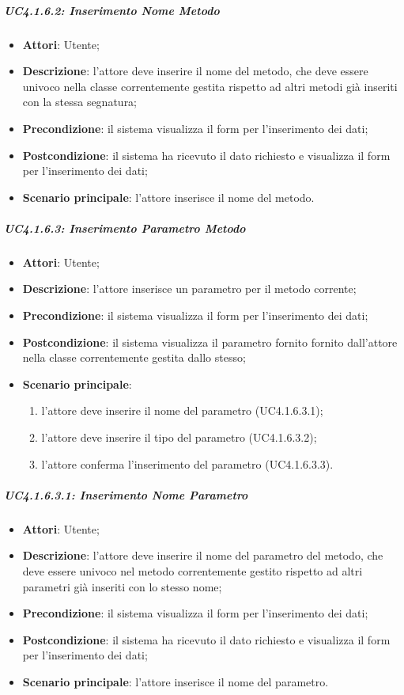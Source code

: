 \subparagraph{UC4.1.6.2: Inserimento Nome Metodo}
\label{UC4.1.6.2}
\begin{itemize}
	\item \textbf{Attori}: Utente;
	\item \textbf{Descrizione}: l'attore deve inserire il nome del metodo, che deve essere univoco nella classe correntemente gestita rispetto ad altri metodi già inseriti con la stessa segnatura;
	\item \textbf{Precondizione}: il sistema visualizza il form per l'inserimento dei dati;
	\item \textbf{Postcondizione}: il sistema ha ricevuto il dato richiesto e visualizza il form per l'inserimento dei dati;
	\item \textbf{Scenario principale}: l'attore inserisce il nome del metodo.
\end{itemize}

\subparagraph{UC4.1.6.3: Inserimento Parametro Metodo}
\label{UC4.1.6.3}
\begin{itemize}
	\item \textbf{Attori}: Utente;
	\item \textbf{Descrizione}: l'attore inserisce un parametro per il metodo corrente;
	\item \textbf{Precondizione}: il sistema visualizza il form per l'inserimento dei dati;
	\item \textbf{Postcondizione}: il sistema visualizza il parametro fornito fornito dall'attore nella classe correntemente gestita dallo stesso;
	\item \textbf{Scenario principale}:
	\begin{enumerate}
		\item l'attore deve inserire il nome del parametro (UC4.1.6.3.1);
		\item l'attore deve inserire il tipo del parametro (UC4.1.6.3.2);
		\item l'attore conferma l'inserimento del parametro (UC4.1.6.3.3).
	\end{enumerate}
\end{itemize}

\subparagraph{UC4.1.6.3.1: Inserimento Nome Parametro}
\label{UC4.1.6.3.1}
\begin{itemize}
	\item \textbf{Attori}: Utente;
	\item \textbf{Descrizione}: l'attore deve inserire il nome del parametro del metodo, che deve essere univoco nel metodo correntemente gestito rispetto ad altri parametri già inseriti con lo stesso nome;
	\item \textbf{Precondizione}: il sistema visualizza il form per l'inserimento dei dati;
	\item \textbf{Postcondizione}: il sistema ha ricevuto il dato richiesto e visualizza il form per l'inserimento dei dati;
	\item \textbf{Scenario principale}: l'attore inserisce il nome del parametro.
\end{itemize}


